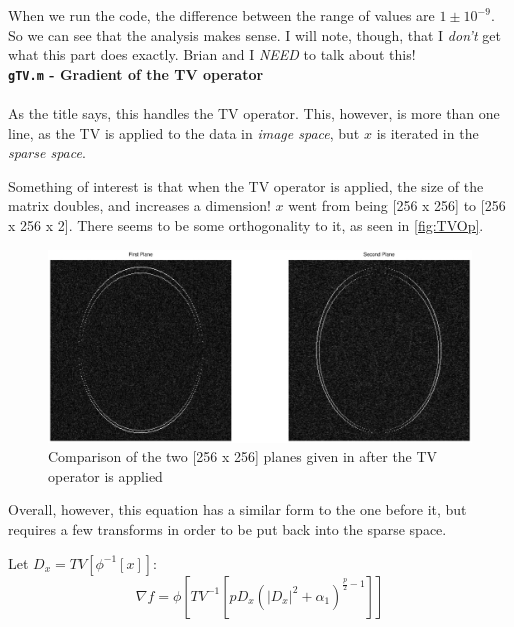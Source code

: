 \documentclass[11 pt]{article}
\newcommand{\bo}{\noindent\textbf}
\begin{document}
            When we run the code, the difference between the range of values are $1 \pm 10^{-9}$. So we can see that the analysis makes sense. I will note, though, that I \emph{don't} get what this part does exactly. Brian and I \emph{NEED} to talk about this!\\

          \bo{\texttt{gTV.m} - Gradient of the TV operator}
            \hfill\\\\
            \noindent As the title says, this handles the TV operator. This, however, is more than one line, as the TV is applied to the data in \emph{image space}, but $x$ is iterated in the \emph{sparse space}.

            Something of interest is that when the TV operator is applied, the size of the matrix doubles, and increases a dimension! $x$ went from being [256 x 256] to [256 x 256 x 2]. There seems to be some orthogonality to it, as seen in \autoref{fig:TVOp}.

            \begin{figure}[!ht] 

              \centering
              \vspace{0pt}
              \setlength\fboxsep{0pt}
              \setlength\fboxrule{0.5pt}
              \includegraphics[trim = {20mm 60mm 20mm 50mm},clip,scale = 0.4] {Figs/CS_Code/TVOperated.eps}
              \caption{Comparison of the two [256 x 256] planes given in after the TV operator is applied}
              \label{fig:TVOp}

              \end{figure}

            Overall, however, this equation has a similar form to the one before it, but requires a few transforms in order to be put back into the sparse space.

            \noindent Let $D_x = TV[\phi^{-1}[x]]$: 
            \[ \nabla f = \phi[TV^{-1}[p D_x (|D_x|^2 + \alpha_1)^{\frac{p}{2} - 1}]]\]
\end{document}
